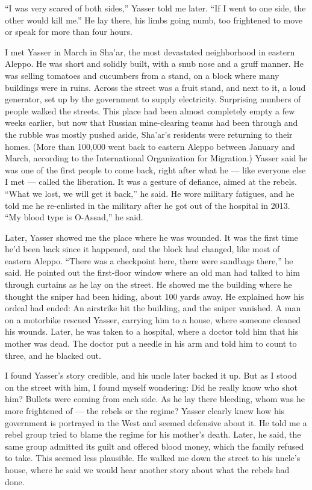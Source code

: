 ``I was very scared of both sides,'' Yasser told me later. ``If I went
to one side, the other would kill me.'' He lay there, his limbs going
numb, too frightened to move or speak for more than four hours.

I met Yasser in March in Sha'ar, the most devastated neighborhood in
eastern Aleppo. He was short and solidly built, with a snub nose and a
gruff manner. He was selling tomatoes and cucumbers from a stand, on a
block where many buildings were in ruins. Across the street was a fruit
stand, and next to it, a loud generator, set up by the government to
supply electricity. Surprising numbers of people walked the streets.
This place had been almost completely empty a few weeks earlier, but now
that Russian mine-clearing teams had been through and the rubble was
mostly pushed aside, Sha'ar's residents were returning to their homes.
(More than 100,000 went back to eastern Aleppo between January and
March, according to the International Organization for Migration.)
Yasser said he was one of the first people to come back, right after
what he --- like everyone else I met --- called the liberation. It was a
gesture of defiance, aimed at the rebels. ``What we lost, we will get it
back,'' he said. He wore military fatigues, and he told me he
re-enlisted in the military after he got out of the hospital in 2013.
``My blood type is O-Assad,'' he said.

Later, Yasser showed me the place where he was wounded. It was the first
time he'd been back since it happened, and the block had changed, like
most of eastern Aleppo. ``There was a checkpoint here, there were
sandbags there,'' he said. He pointed out the first-floor window where
an old man had talked to him through curtains as he lay on the street.
He showed me the building where he thought the sniper had been hiding,
about 100 yards away. He explained how his ordeal had ended: An
airstrike hit the building, and the sniper vanished. A man on a
motorbike rescued Yasser, carrying him to a house, where someone cleaned
his wounds. Later, he was taken to a hospital, where a doctor told him
that his mother was dead. The doctor put a needle in his arm and told
him to count to three, and he blacked out.

I found Yasser's story credible, and his uncle later backed it up. But
as I stood on the street with him, I found myself wondering: Did he
really know who shot him? Bullets were coming from each side. As he lay
there bleeding, whom was he more frightened of --- the rebels or the
regime? Yasser clearly knew how his government is portrayed in the West
and seemed defensive about it. He told me a rebel group tried to blame
the regime for his mother's death. Later, he said, the same group
admitted its guilt and offered blood money, which the family refused to
take. This seemed less plausible. He walked me down the street to his
uncle's house, where he said we would hear another story about what the
rebels had done.

